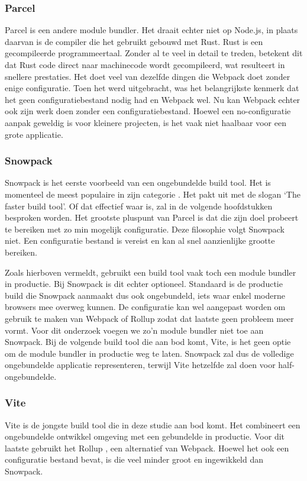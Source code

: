 \subsubsection{Parcel}

Parcel is een andere module bundler. Het draait echter niet op Node.js, in plaats daarvan is de compiler die het gebruikt gebouwd met Rust. Rust is een gecompileerde programmeertaal. Zonder al te veel in detail te treden, betekent dit dat Rust code direct naar machinecode wordt gecompileerd, wat resulteert in snellere prestaties. Het doet veel van dezelfde dingen die Webpack doet zonder enige configuratie. Toen het werd uitgebracht, was het belangrijkste kenmerk dat het geen configuratiebestand nodig had en Webpack wel. Nu kan Webpack echter ook zijn werk doen zonder een configuratiebestand. Hoewel een no-configuratie aanpak geweldig is voor kleinere projecten, is het vaak niet haalbaar voor een grote applicatie. 

\subsubsection{Snowpack}

Snowpack is het eerste voorbeeld van een ongebundelde build tool. Het is momenteel de meest populaire in zijn categorie \autocite{stateofjs-2020}. Het pakt uit met de slogan ‘The faster build tool’. Of dat effectief waar is, zal in de volgende hoofdstukken besproken worden. Het grootste pluspunt van Parcel is dat die zijn doel probeert te bereiken met zo min mogelijk configuratie. Deze filosophie volgt Snowpack niet. Een configuratie bestand is vereist en kan al snel aanzienlijke grootte bereiken.

Zoals hierboven vermeldt, gebruikt een build tool vaak toch een module bundler in productie. Bij Snowpack is dit echter optioneel. Standaard is de productie build die Snowpack aanmaakt dus ook ongebundeld, iets waar enkel moderne browsers mee overweg kunnen. De configuratie kan wel aangepast worden om gebruik te maken van Webpack of Rollup zodat dat laatste geen probleem meer vormt. Voor dit onderzoek voegen we zo’n module bundler niet toe aan Snowpack. Bij de volgende build tool die aan bod komt, Vite, is het geen optie om de module bundler in productie weg te laten. Snowpack zal dus de volledige ongebundelde applicatie representeren, terwijl Vite hetzelfde zal doen voor half-ongebundelde.

\subsubsection{Vite}
Vite is de jongste build tool die in deze studie aan bod komt. Het combineert een ongebundelde ontwikkel omgeving met een gebundelde in productie. Voor dit laatste gebruikt het Rollup \autocite{vite-no-date}, een alternatief van Webpack. Hoewel het ook een configuratie bestand bevat, is die veel minder groot en ingewikkeld dan Snowpack.

